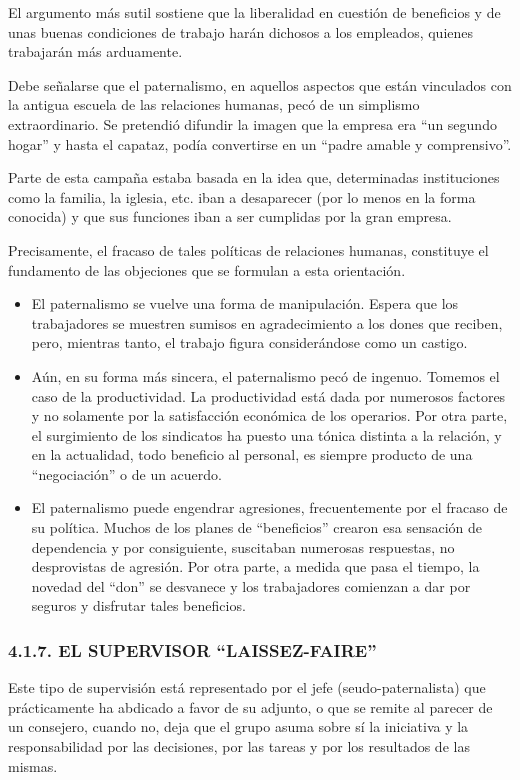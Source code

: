 
El argumento más sutil sostiene que la liberalidad en cuestión de beneficios y de unas buenas condiciones de trabajo harán dichosos a los empleados, quienes trabajarán más arduamente.

Debe señalarse que el paternalismo, en aquellos aspectos que están vinculados con la antigua escuela de las relaciones humanas, pecó de un simplismo extraordinario. Se pretendió difundir la imagen que la empresa era “un segundo hogar” y hasta el capataz, podía convertirse en un “padre amable y comprensivo”.

Parte de esta campaña estaba basada en la idea que, determinadas instituciones como la familia, la iglesia, etc. iban a desaparecer (por lo menos en la forma conocida) y que sus funciones iban a ser cumplidas por la gran empresa.

Precisamente, el fracaso de tales políticas de relaciones humanas, constituye el fundamento de las objeciones que se formulan a esta orientación.

\begin{itemize}
  \item El paternalismo se vuelve una forma de manipulación. Espera que los trabajadores se muestren sumisos en agradecimiento a los dones que reciben, pero, mientras tanto, el trabajo figura considerándose como un castigo.
  \item Aún, en su forma más sincera, el paternalismo pecó de ingenuo. Tomemos el caso de la productividad. La productividad está dada por numerosos factores y no solamente por la satisfacción económica de los operarios. Por otra parte, el surgimiento de los sindicatos ha puesto una tónica distinta a la relación, y en la actualidad, todo beneficio al personal, es siempre producto de una “negociación” o de un acuerdo.
  \item El paternalismo puede engendrar agresiones, frecuentemente por el fracaso de su política. Muchos de los planes de “beneficios” crearon esa sensación de dependencia y por consiguiente, suscitaban numerosas respuestas, no desprovistas de agresión. Por otra parte, a medida que pasa el tiempo, la novedad del “don” se desvanece y los trabajadores comienzan a dar por seguros y disfrutar tales beneficios.
\end{itemize}
\subsubsection*{4.1.7. EL SUPERVISOR “LAISSEZ-FAIRE”}
Este tipo de supervisión está representado por el jefe (seudo-paternalista) que prácticamente ha abdicado a favor de su adjunto, o que se remite al parecer de un consejero, cuando no, deja que el grupo asuma sobre sí la iniciativa y la responsabilidad por las decisiones, por las tareas y por los resultados de las mismas.



